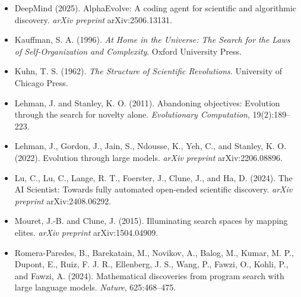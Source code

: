 \begin{itemize}
\item DeepMind (2025). AlphaEvolve: A coding agent for scientific and algorithmic discovery. \textit{arXiv preprint} arXiv:2506.13131.
\end{itemize}

\begin{itemize}
\item Kauffman, S. A. (1996). \textit{At Home in the Universe: The Search for the Laws of Self-Organization and Complexity}. Oxford University Press.
\end{itemize}

\begin{itemize}
\item Kuhn, T. S. (1962). \textit{The Structure of Scientific Revolutions}. University of Chicago Press.
\end{itemize}

\begin{itemize}
\item Lehman, J. and Stanley, K. O. (2011). Abandoning objectives: Evolution through the search for novelty alone. \textit{Evolutionary Computation}, 19(2):189--223.
\end{itemize}

\begin{itemize}
\item Lehman, J., Gordon, J., Jain, S., Ndousse, K., Yeh, C., and Stanley, K. O. (2022). Evolution through large models. \textit{arXiv preprint} arXiv:2206.08896.
\end{itemize}

\begin{itemize}
\item Lu, C., Lu, C., Lange, R. T., Foerster, J., Clune, J., and Ha, D. (2024). The AI Scientist: Towards fully automated open-ended scientific discovery. \textit{arXiv preprint} arXiv:2408.06292.
\end{itemize}

\begin{itemize}
\item Mouret, J.-B. and Clune, J. (2015). Illuminating search spaces by mapping elites. \textit{arXiv preprint} arXiv:1504.04909.
\end{itemize}

\begin{itemize}
\item Romera-Paredes, B., Barekatain, M., Novikov, A., Balog, M., Kumar, M. P., Dupont, E., Ruiz, F. J. R., Ellenberg, J. S., Wang, P., Fawzi, O., Kohli, P., and Fawzi, A. (2024). Mathematical discoveries from program search with large language models. \textit{Nature}, 625:468--475.
\end{itemize}

